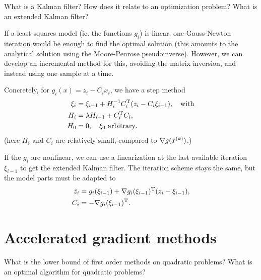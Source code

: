 \documentclass{article}
\begin{document}
\begin{question}
  What is a Kalman filter? How does it relate to an optimization problem?  What is an extended
  Kalman filter?
\end{question}

If a least-squares model (ie. the functions \(g_i\)) is linear, one Gauss-Newton iteration would be
enough to find the optimal solution (this amounts to the analytical solution using the Moore-Penrose
pseudoinverse).  However, we can develop an incremental method for this, avoiding the matrix
inversion, and instead using one sample at a time.

Concretely, for \(g_i(x) = z_i - C_i x_i\), we have a step method
\begin{align*}
  \xi_i &= \xi_{i-1} + H_i^{-1}C_i^{\mathrm{T}}(z_i - C_i \xi_{i-1}), \quad\text{with} \\
  H_i &= \lambda H_{i-1} + C_i^{\mathrm{T}}C_i, \\
  H_0 &= 0,\quad \xi_0 \text{ arbitrary}.
\end{align*}
(here \(H_i\) and \(C_i\) are relatively small, compared to \(\nabla g(x^{(k)})\).)

If the \(g_i\) are nonlinear, we can use a linearization at the last available iteration
\(\xi_{i-1}\) to get the extended Kalman filter.  The iteration scheme stays the same, but the model
parts must be adapted to
\begin{align*}
  \tilde{z}_i &= g_i(\xi_{i-1}) + \nabla g_i(\xi_{i-1})^{\mathrm{T}}(z_i - \xi_{i-1}), \\
  C_i &= - \nabla g_i(\xi_{i-1})^{\mathrm{T}}.
\end{align*}

\section{Accelerated gradient methods}

\begin{question}
  What is the lower bound of first order methods on quadratic problems?  What is an optimal
  algorithm for quadratic problems?
\end{question}
\end{document}
